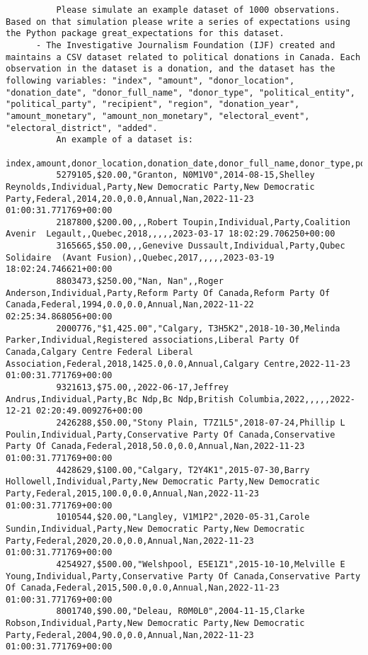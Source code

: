 \documentclass[
  letterpaper,
  DIV=11,
  numbers=noendperiod]{scrartcl}
\begin{document}
\begin{itemize}
\begin{lstlisting}
          Please simulate an example dataset of 1000 observations. Based on that simulation please write a series of expectations using the Python package great_expectations for this dataset.
      - The Investigative Journalism Foundation (IJF) created and maintains a CSV dataset related to political donations in Canada. Each observation in the dataset is a donation, and the dataset has the following variables: "index", "amount", "donor_location", "donation_date", "donor_full_name", "donor_type", "political_entity", "political_party", "recipient", "region", "donation_year", "amount_monetary", "amount_non_monetary", "electoral_event", "electoral_district", "added". 
          An example of a dataset is: 
          index,amount,donor_location,donation_date,donor_full_name,donor_type,political_entity,political_party,recipient,region,donation_year,amount_monetary,amount_non_monetary,electoral_event,electoral_district,added
          5279105,$20.00,"Granton, N0M1V0",2014-08-15,Shelley Reynolds,Individual,Party,New Democratic Party,New Democratic Party,Federal,2014,20.0,0.0,Annual,Nan,2022-11-23 01:00:31.771769+00:00
          2187800,$200.00,,,Robert Toupin,Individual,Party,Coalition Avenir  Legault,,Quebec,2018,,,,,2023-03-17 18:02:29.706250+00:00
          3165665,$50.00,,,Genevive Dussault,Individual,Party,Qubec Solidaire  (Avant Fusion),,Quebec,2017,,,,,2023-03-19 18:02:24.746621+00:00
          8803473,$250.00,"Nan, Nan",,Roger Anderson,Individual,Party,Reform Party Of Canada,Reform Party Of Canada,Federal,1994,0.0,0.0,Annual,Nan,2022-11-22 02:25:34.868056+00:00
          2000776,"$1,425.00","Calgary, T3H5K2",2018-10-30,Melinda Parker,Individual,Registered associations,Liberal Party Of Canada,Calgary Centre Federal Liberal Association,Federal,2018,1425.0,0.0,Annual,Calgary Centre,2022-11-23 01:00:31.771769+00:00
          9321613,$75.00,,2022-06-17,Jeffrey Andrus,Individual,Party,Bc Ndp,Bc Ndp,British Columbia,2022,,,,,2022-12-21 02:20:49.009276+00:00
          2426288,$50.00,"Stony Plain, T7Z1L5",2018-07-24,Phillip L Poulin,Individual,Party,Conservative Party Of Canada,Conservative Party Of Canada,Federal,2018,50.0,0.0,Annual,Nan,2022-11-23 01:00:31.771769+00:00
          4428629,$100.00,"Calgary, T2Y4K1",2015-07-30,Barry Hollowell,Individual,Party,New Democratic Party,New Democratic Party,Federal,2015,100.0,0.0,Annual,Nan,2022-11-23 01:00:31.771769+00:00
          1010544,$20.00,"Langley, V1M1P2",2020-05-31,Carole Sundin,Individual,Party,New Democratic Party,New Democratic Party,Federal,2020,20.0,0.0,Annual,Nan,2022-11-23 01:00:31.771769+00:00
          4254927,$500.00,"Welshpool, E5E1Z1",2015-10-10,Melville E Young,Individual,Party,Conservative Party Of Canada,Conservative Party Of Canada,Federal,2015,500.0,0.0,Annual,Nan,2022-11-23 01:00:31.771769+00:00
          8001740,$90.00,"Deleau, R0M0L0",2004-11-15,Clarke Robson,Individual,Party,New Democratic Party,New Democratic Party,Federal,2004,90.0,0.0,Annual,Nan,2022-11-23 01:00:31.771769+00:00


\end{lstlisting}
\end{itemize}
\end{document}
